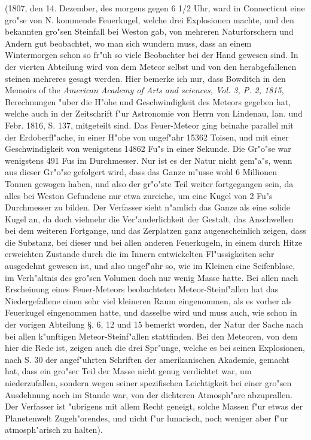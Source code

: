 \documentclass[a4paper, 11pt, oneside, polutonikogreek, german]{article}
\begin{document}
(1807, den 14. Dezember, des morgens gegen 6 1/2 Uhr, ward in Connecticut eine gro"se von N. kommende Feuerkugel, welche drei Explosionen machte, und den bekannten gro"sen Steinfall bei Weston gab, von mehreren Naturforschern und Andern gut beobachtet, wo man sich wundern muss, dass an einem Wintermorgen schon so fr"uh so viele Beobachter bei der Hand gewesen sind. In der vierten Abteilung wird von dem Meteor selbst und von den herabgefallenen steinen mehreres gesagt werden. Hier bemerke ich nur, dass Bowditch in den Memoirs of the \emph{American Academy of Arts and sciences, Vol. 3, P. 2, 1815}, Berechnungen "uber die H"ohe und Geschwindigkeit des Meteors gegeben hat, welche auch in der Zeitschrift f"ur Astronomie von Herrn von Lindenau, Ian. und Febr. 1816, S. 137, mitgeteilt sind. Das Feuer-Meteor ging beinahe parallel mit der Erdoberfl"ache, in einer H"ohe von ungef"ahr 15362 Toisen, und mit einer Geschwindigkeit von wenigstens 14862 Fu"s in einer Sekunde. Die Gr"o"se war wenigstens 491 Fus im Durchmesser. Nur ist es der Natur nicht gem"a"s, wenn aus dieser Gr"o"se gefolgert wird, dass das Ganze m"usse wohl 6 Millionen Tonnen gewogen haben, und also der gr"o"ste Teil weiter fortgegangen sein, da alles bei Weston Gefundene nur etwa zureiche, um eine Kugel von 2 Fu"s Durchmesser zu bilden. Der Verfasser sieht n"amlich das Ganze als eine solide Kugel an, da doch vielmehr die Ver"anderlichkeit der Gestalt, das Anschwellen bei dem weiteren Fortgange, und das Zerplatzen ganz augenscheinlich zeigen, dass die Substanz, bei dieser und bei allen anderen Feuerkugeln, in einem durch Hitze erweichten Zustande durch die im Innern entwickelten Fl"ussigkeiten sehr ausgedehnt gewesen ist, und also ungef"ahr so, wie im Kleinen eine Seifenblase, im Verh"altnis des gro"sen Volumen doch nur wenig Masse hatte. Bei allen nach Erscheinung eines Feuer-Meteors beobachteten Meteor-Steinf"allen hat das Niedergefallene einen sehr viel kleineren Raum eingenommen, als es vorher als Feuerkugel eingenommen hatte, und dasselbe wird und muss auch, wie schon in der vorigen Abteilung §. 6, 12 und 15 bemerkt worden, der Natur der Sache nach bei allen k"unftigen Meteor-Steinf"allen stattfinden. Bei den Meteoren, von dem hier die Rede ist, zeigen auch die drei Spr"unge, welche es bei seinen Explosionen, nach S. 30 der angef"uhrten Schriften der amerikanischen Akademie, gemacht hat, dass ein gro"ser Teil der Masse nicht genug verdichtet war, um niederzufallen, sondern wegen seiner spezifischen Leichtigkeit bei einer gro"sen Ausdehnung noch im Stande war, von der dichteren Atmosph"are abzuprallen. Der Verfasser ist "ubrigens mit allem Recht geneigt, solche Massen f"ur etwas der Planetenwelt Zugeh"orendes, und nicht f"ur lunarisch, noch weniger aber f"ur atmosph"arisch zu halten).
\end{document}
